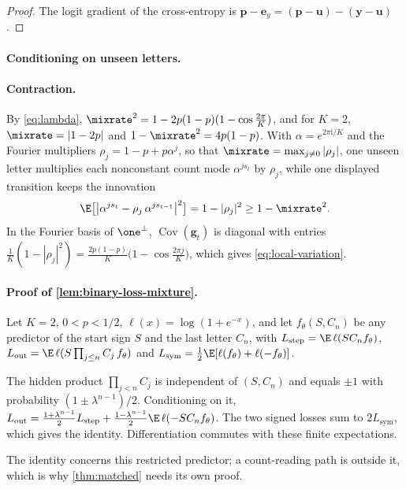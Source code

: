 \begin{proof}
The logit gradient of the cross-entropy is $\bm p-\bm e_y=(\bm p-\bm u)-(\bm y-\bm u)$.
\end{proof}

\paragraph{Conditioning on unseen letters.}
\label{app:target-spectrum}

\paragraph{Contraction.}\label{app:contraction} By \cref{eq:lambda}, $\mixrate^2=1-2p(1-p)(1-\cos\tfrac{2\pi}{K})$, and for $K=2$,
$\mixrate=|1-2p|$ and $1-\mixrate^2=4p(1-p)$. With $\alpha=e^{2\pi\mathrm i/K}$ and the Fourier multipliers
$\rho_j=1-p+p\alpha^j$, so that $\mixrate=\max_{j\ne0}|\rho_j|$, one unseen letter multiplies each nonconstant count
mode $\alpha^{js_t}$ by $\rho_j$, while one displayed transition keeps the innovation
\begin{equation}
 \E\bigl[\bigl|\alpha^{j s_t}-\rho_j\,\alpha^{j s_{t-1}}\bigr|^2\bigr]=1-|\rho_j|^2\ge1-\mixrate^2 .
 \label{eq:move-variance}
\end{equation}
In the Fourier basis of $\one^\perp$, $\operatorname{Cov}(\bm g_t)$ is diagonal with entries $\tfrac{1}{K}(1-|\rho_j|^2)=\tfrac{2p(1-p)}{K}\bigl(1-\cos\tfrac{2\pi j}{K}\bigr)$,
which gives \cref{eq:local-variation}.

\paragraph{Proof of \cref{lem:binary-loss-mixture}.} Let $K=2$, $0<p<1/2$, $\ell(x)=\log(1+e^{-x})$, and let $f_\theta(S,C_n)$ be
any predictor of the start sign $S$ and the last letter $C_n$, with
$L_{\mathrm{step}}=\E\,\ell(SC_nf_\theta)$, $L_{\mathrm{out}}=\E\,\ell(S\prod_{j\le n}C_j\,f_\theta)$ and
$L_{\mathrm{sym}}=\frac12\E[\ell(f_\theta)+\ell(-f_\theta)]$.

The hidden product $\prod_{j<n}C_j$ is independent of $(S,C_n)$ and equals $\pm1$ with probability
$(1\pm\lambda^{n-1})/2$. Conditioning on it,
$L_{\mathrm{out}}=\frac{1+\lambda^{n-1}}2L_{\mathrm{step}}+\frac{1-\lambda^{n-1}}2\E\,\ell(-SC_nf_\theta)$.
The two signed losses sum to $2L_{\mathrm{sym}}$, which gives the identity. Differentiation commutes with these finite expectations.

The identity concerns this restricted predictor; a count-reading path is outside it, which is why
\cref{thm:matched} needs its own proof.

